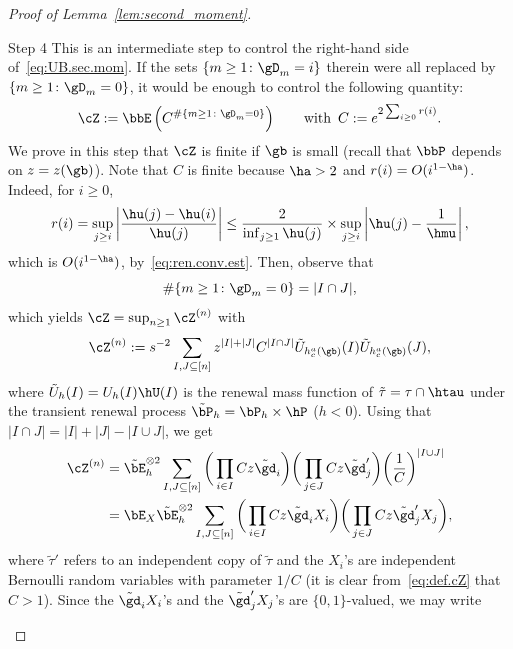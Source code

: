 \begin{proof}[Proof of Lemma~\ref{lem:second_moment}]
\begin{step}{Step 4}
This is an intermediate step to control the right-hand side of~\eqref{eq:UB.sec.mom}. If the sets $\{m \geq 1 \colon \gD_m = i\}$ therein were all replaced by $\{m \geq 1 \colon \gD_m = 0\}$, it would be enough to control the following quantity:
\begin{equation}\label{eq:def.cZ}
\cZ := \bbE \left(C^{\#\{m \geq 1 \colon \gD_m = 0\} } \right)\qquad \text{with }\, C := e^{2 \sum_{i\geq 0} r(i)}.
\end{equation}
We prove in this step that $\cZ$ is finite if $\gb$ is small (recall that $\bbP$ depends on $z = z(\gb)$). Note that $C$ is finite because $\ha > 2$ and $r(i) = O(i^{1 - \ha})$. Indeed, for $i \geq 0$,
\begin{equation}
r(i) = \sup_{j\geq i} \left| \frac{\hu(j) - \hu(i)}{\hu(j)} \right| \leq \frac{2}{\inf_{j\geq1} \hu(j)} \times \sup_{j\geq i} \left| \hu(j) - \frac{1}{\hmu} \right|,
\end{equation}
which is $O(i^{1 - \ha})$, by~\eqref{eq:ren.conv.est}. Then, observe that
\begin{equation}
\#\{m \geq 1 \colon \gD_m = 0\} = |I \cap J|,
\end{equation}
which yields $\cZ = \sup_{n\geq1} \cZ^{(n)}$ with
\begin{equation}
\cZ^{(n)} := s^{- 2} \sum_{I,J\subseteq [n]} z^{|I| + |J|} C^{|I \cap J|} \tilde U_{h_c^a(\gb)}(I) \tilde U_{h_c^a(\gb)}(J),
\end{equation}
where $\tilde U_h(I) = U_h(I) \hU(I)$ is the renewal mass function of $\tilde\tau = \tau \cap \htau$ under the transient renewal process $\tilde \bP_h = \bP_h \times \hP$ ($h < 0$). Using that $|I \cap J| = |I| + |J| - |I \cup J|$, we get
\begin{equation}
\begin{aligned}
\cZ^{(n)} &= \tilde\bE_h^{\otimes 2} \sum_{I,J\subseteq [n]} \bigg(\prod_{i\in I} C z \tilde \gd_i \bigg) \bigg(\prod_{j\in J} C z \tilde \gd_j' \bigg) \bigg(\frac{1}{C} \bigg)^{|I \cup J|}\\
&= \bE_X \tilde \bE_h^{\otimes 2} \sum_{I,J\subseteq [n]} \bigg(\prod_{i\in I} C z \tilde \gd_i X_i \bigg) \bigg(\prod_{j\in J} C z \tilde \gd_j' X_j \bigg),
\end{aligned}
\end{equation}
where $\tilde \tau'$ refers to an independent copy of $\tilde \tau$ and the $X_i$'s are independent Bernoulli random variables with parameter $1/C$ (it is clear from~\eqref{eq:def.cZ} that $C > 1$). Since the $\tilde \gd_i X_i$'s and the $\tilde\gd_j' X_j$'s are $\{0,1\}$-valued, we may write

\end{step}
\end{proof}
